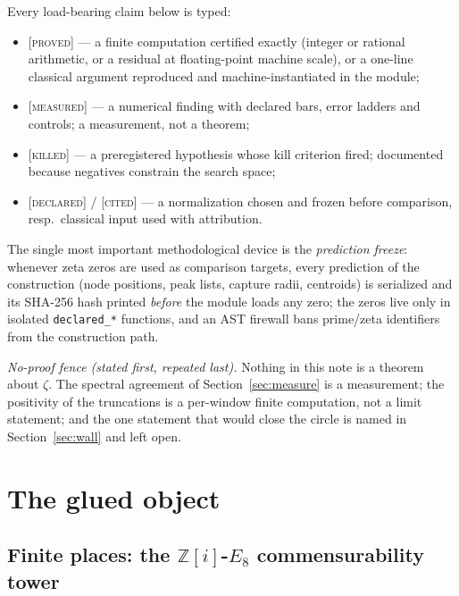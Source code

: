 \documentclass[11pt,a4paper]{article}
\theoremstyle{remark}
\newcommand{\Z}{\mathbb Z}
\newcommand{\PROVED}{\textnormal{[\textsc{proved}]}}
\newcommand{\MEASURED}{\textnormal{[\textsc{measured}]}}
\newcommand{\KILLED}{\textnormal{[\textsc{killed}]}}
\newcommand{\DECLARED}{\textnormal{[\textsc{declared}]}}
\newcommand{\CITED}{\textnormal{[\textsc{cited}]}}
\begin{document}
Every load-bearing claim below is typed:
\begin{itemize}
\item \PROVED{} --- a finite computation certified exactly (integer
or rational arithmetic, or a residual at floating-point machine
scale), or a one-line classical argument reproduced and
machine-instantiated in the module;
\item \MEASURED{} --- a numerical finding with declared bars, error
ladders and controls; a measurement, not a theorem;
\item \KILLED{} --- a preregistered hypothesis whose kill criterion
fired; documented because negatives constrain the search space;
\item \DECLARED{} / \CITED{} --- a normalization chosen and frozen
before comparison, resp.\ classical input used with attribution.
\end{itemize}
The single most important methodological device is the
\emph{prediction freeze}: whenever zeta zeros are used as comparison
targets, every prediction of the construction (node positions, peak
lists, capture radii, centroids) is serialized and its SHA-256 hash
printed \emph{before} the module loads any zero; the zeros live only
in isolated \texttt{declared\_*} functions, and an AST firewall bans
prime/zeta identifiers from the construction path.

\emph{No-proof fence (stated first, repeated last).}  Nothing in this
note is a theorem about $\zeta$.  The spectral agreement of
Section~\ref{sec:measure} is a measurement; the positivity of the
truncations is a per-window finite computation, not a limit
statement; and the one statement that would close the circle is named
in Section~\ref{sec:wall} and left open.

\section{The glued object}\label{sec:setup}

\subsection{Finite places: the \texorpdfstring{$\Z[i]$-$E_8$}{Z[i]-E8}
commensurability tower}\label{sec:tower}
\end{document}
